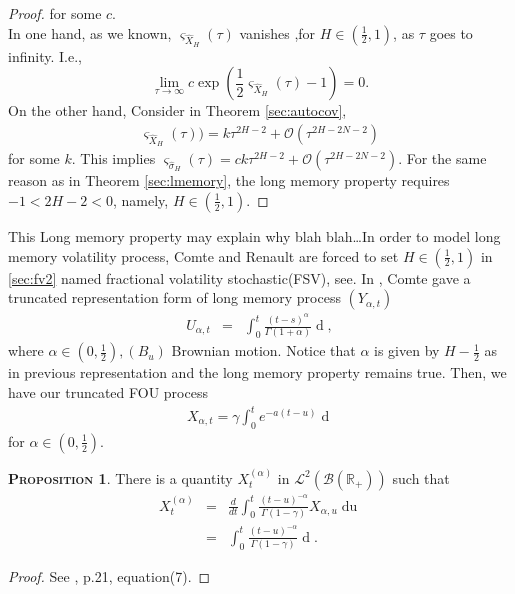 \documentclass[a4paper, twoside, 11pt]{article}
\theoremstyle{definition}
\newtheorem{proposition}[definition]{\scshape Proposition}
\begin{document}
\begin{proof}
 for some $c$.\\
 In one hand, as we known, $\varsigma_{\hat{X}_{H}}(\tau)$ vanishes ,for $H\in(\frac{1}{2}, 1)$, as $\tau$ goes to infinity. I.e.,
 $$
 \lim\limits_{\tau\rightarrow \infty}c\exp(\frac{1}{2}\varsigma_{\hat{X}_{H}}(\tau) - 1) = 0.
 $$
 On the other hand, 
 Consider in Theorem \ref{sec:autocov},
\begin{eqnarray*}
  \varsigma_{\hat{X}_{H}}(\tau)) = k \tau^{2H-2} + \mathcal{O}(\tau^{2H-2N-2})
\end{eqnarray*}
for some $k$. This implies $\varsigma_{\hat{\sigma}_H}(\tau) = ck \tau^{2H-2} + \mathcal{O}(\tau^{2H-2N-2})$. For the same reason as in Theorem \ref{sec:lmemory}, the long memory property requires $-1<2H-2<0$, namely, $H\in(\frac{1}{2}, 1)$.
\end{proof}

This Long memory property may explain why blah blah\dots In order to model long memory volatility process, Comte and Renault are forced to set $H\in (\frac{1}{2}, 1)$ in \ref{sec:fv2} named fractional volatility stochastic(FSV), see\cite{comren}. In \cite{comte}, Comte gave a truncated representation form of long memory process $(Y_{\alpha,t})$
\begin{eqnarray}
  U_{\alpha,t} &=& \int_0^t \frac{(t-s)^\alpha}{\Gamma(1+\alpha)}\mathop{dB_u}, 
  \label{<sec:cc1>}
\end{eqnarray}
where $\alpha \in (0, \frac{1}{2}), (B_u)$ Brownian motion. Notice that $\alpha$ is given by $H-\frac{1}{2}$ as in previous representation and the long memory property remains true. Then, we have our truncated FOU process
\begin{eqnarray}
  X_{\alpha,t} = \gamma\int_0^t e^{-a(t-u)}\mathop{dU_{\alpha, u}} 
  \label{sec:cc2}
\end{eqnarray}
for $\alpha \in (0, \frac{1}{2})$.

\begin{proposition}
  There is a quantity $X^{(\alpha)}_t $ in $\mathcal{L}^2(\mathscr{B}(\mathbb{R_+}))$ such that
  \begin{eqnarray}
	X^{(\alpha)}_t &=&  \frac{d}{dt}\int_0^t \frac{(t-u)^{-\alpha}}{\Gamma(1-\gamma)} X_{\alpha,u} \mathop{du} \nonumber\\
	&=&  \int_0^t \frac{(t-u)^{-\alpha}}{\Gamma(1-\gamma)} \mathop{dX_{\alpha,u}}  .
	\label{sec:cc4}
  \end{eqnarray}
\end{proposition}
\begin{proof}
  See \cite{comte}, p.21, equation(7).
\end{proof}
\end{document}
